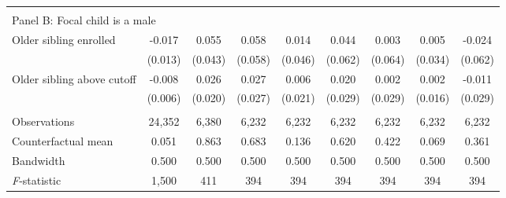 {{\begin{tabular}{lcccccccc}
&  &  &  & & & & & \\
\multicolumn{10}{l}{Panel B: Focal child is a male} \\
Older sibling enrolled&      -0.017   &       0.055   &       0.058   &       0.014   &       0.044   &       0.003   &       0.005   &      -0.024   \\
                    &     (0.013)   &     (0.043)   &     (0.058)   &     (0.046)   &     (0.062)   &     (0.064)   &     (0.034)   &     (0.062)   \\
 
Older sibling above cutoff&      -0.008   &       0.026   &       0.027   &       0.006   &       0.020   &       0.002   &       0.002   &      -0.011   \\
                    &     (0.006)   &     (0.020)   &     (0.027)   &     (0.021)   &     (0.029)   &     (0.029)   &     (0.016)   &     (0.029)   \\
                    &               &               &               &               &               &               &               &               \\
Observations        &      24,352   &       6,380   &       6,232   &       6,232   &       6,232   &       6,232   &       6,232   &       6,232   \\
Counterfactual mean &       0.051   &       0.863   &       0.683   &       0.136   &       0.620   &       0.422   &       0.069   &       0.361   \\
Bandwidth           &       0.500   &       0.500   &       0.500   &       0.500   &       0.500   &       0.500   &       0.500   &       0.500   \\
\textit{F}-statistic&       1,500   &         411   &         394   &         394   &         394   &         394   &         394   &         394   \\
 

\bottomrule
\end{tabular}
}
}

